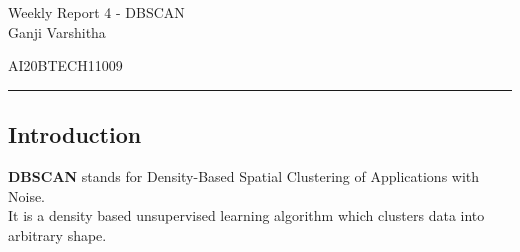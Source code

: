 \documentclass[12pt,letterpaper, onecolumn]{exam}
\begin{document}
\newtheorem{theorem}{Theorem}[section]
\newtheorem{problem}{Problem}
\newtheorem{proposition}{Proposition}[section]
\newtheorem{lemma}{Lemma}[section]
\newtheorem{corollary}[theorem]{Corollary}
\newtheorem{example}{Example}[section]
\newtheorem{definition}[problem]{Definition}

\newcommand{\BEQA}{\begin{eqnarray}}
\newcommand{\EEQA}{\end{eqnarray}}
\newcommand{\define}{\stackrel{\triangle}{=}}

\raggedbottom
\setlength{\parindent}{0pt}
\providecommand{\mbf}{\mathbf}
\providecommand{\norm}[1]{\lVert#1\rVert}
\providecommand{\pr}[1]{\ensuremath{\Pr\left(#1\right)}}
\providecommand{\qfunc}[1]{\ensuremath{Q\left(#1\right)}}
\providecommand{\sbrak}[1]{\ensuremath{{}\left[#1\right]}}
\providecommand{\lsbrak}[1]{\ensuremath{{}\left[#1\right.}}
\providecommand{\rsbrak}[1]{\ensuremath{{}\left.#1\right]}}
\providecommand{\brak}[1]{\ensuremath{\left(#1\right)}}
\providecommand{\lbrak}[1]{\ensuremath{\left(#1\right.}}
\providecommand{\rbrak}[1]{\ensuremath{\left.#1\right)}}
\providecommand{\cbrak}[1]{\ensuremath{\left\{#1\right\}}}
\providecommand{\lcbrak}[1]{\ensuremath{\left\{#1\right.}}
\providecommand{\rcbrak}[1]{\ensuremath{\left.#1\right\}}}
\let\vec\mathbf




\begingroup  
    \centering
    
    \LARGE Weekly Report 4 - DBSCAN\\[0.5em]
    
    \large Ganji Varshitha\par
    \large AI20BTECH11009\par
\endgroup
\rule{\textwidth}{0.4pt}
\pointsdroppedatright   %
\printanswers
\newcommand\Solution{
  \textbf{Solution:}\\}
\newcommand{\myvec}[1]{\ensuremath{\begin{bmatrix}#1\end{bmatrix}}}

\subsection*{Introduction}
\textbf{DBSCAN} stands for Density-Based Spatial Clustering of Applications with Noise.\\
It is a density based unsupervised learning algorithm which clusters data into arbitrary shape. 
\end{document}
